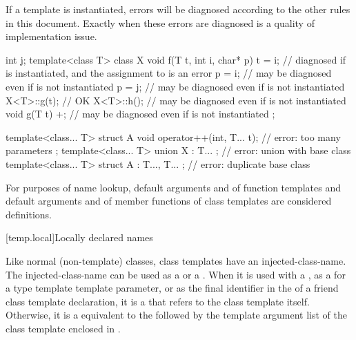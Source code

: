 \begin{note}
If a template is instantiated, errors will be diagnosed according
to the other rules in this document.
Exactly when these errors are diagnosed is a quality of implementation issue.
\end{note}
\begin{example}
\begin{codeblock}
int j;
template<class T> class X {
  void f(T t, int i, char* p) {
    t = i;          // diagnosed if  is instantiated, and the assignment to  is an error
    p = i;          // may be diagnosed even if  is not instantiated
    p = j;          // may be diagnosed even if  is not instantiated
    X<T>::g(t);     // OK
    X<T>::h();      // may be diagnosed even if  is not instantiated
  }
  void g(T t) {
    +;              // may be diagnosed even if  is not instantiated
  }
};

template<class... T> struct A {
  void operator++(int, T... t);                     // error: too many parameters
};
template<class... T> union X : T... { };            // error: union with base class
template<class... T> struct A : T...,  T... { };    // error: duplicate base class
\end{codeblock}
\end{example}

\pnum
\begin{note}
For purposes of name lookup, default arguments and
 of function templates and default
arguments and  of
member functions of class templates are considered definitions.
\end{note}

[temp.local]{Locally declared names}

\pnum
Like normal (non-template) classes, class templates have an
injected-class-name.
The
injected-class-name can be used
as a  or a .
When it is used with a
,
as a  for a type template template parameter,
or as the final identifier in the  of
a friend class template declaration,
it is a  that refers to the
class template itself.
Otherwise, it is a 
equivalent to the 
followed by
the template argument list
of the class template
enclosed in \tcode{<>}.

